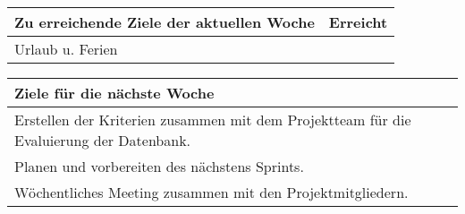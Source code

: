 \begin{tabularx}{\textwidth}{Xc}
    \arrayrulecolor{OliveGreen}
    \toprule
    {\bfseries Zu erreichende Ziele der aktuellen Woche} & {\bfseries Erreicht} \\
    \midrule[2pt]
    Urlaub u. Ferien
\bottomrule[2pt]
\end{tabularx}
%
\vspace{1cm}
%
\begin{tabularx}{\textwidth}{Xc}
    \arrayrulecolor{OliveGreen}
    \toprule
    {\bfseries Ziele für die nächste Woche}              &                      \\
    \midrule[2pt]
    Erstellen der Kriterien zusammen mit dem Projektteam für die Evaluierung
    der Datenbank. &                      \\
    \rowcolor{OliveGreen!15}
    Planen und vorbereiten des nächstens Sprints.      &                      \\
    \rowcolor{White}
    Wöchentliches Meeting zusammen mit den Projektmitgliedern. &         \\
\end{tabularx}
